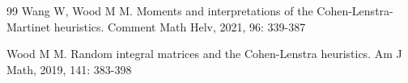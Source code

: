\documentclass[a4]{amsart}
\theoremstyle{remark} \newtheorem{remark}[theorem]{Remark}
\begin{document}
\begin{thebibliography}{99}
Wang W, Wood M M. Moments and interpretations of the Cohen-Lenstra-Martinet heuristics. Comment Math Helv, 2021, 96: 339-387  

Wood M M. Random integral matrices and the Cohen-Lenstra heuristics. Am J Math, 2019, 141: 383-398 







\end{thebibliography}
\end{document}

